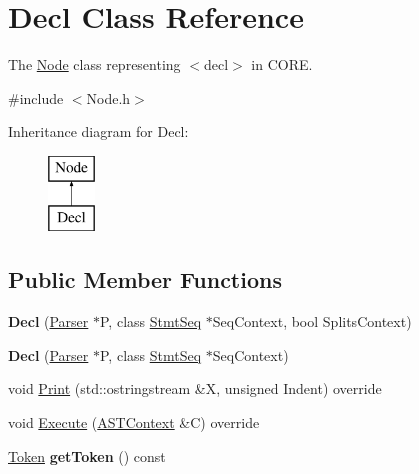\hypertarget{class_decl}{}\section{Decl Class Reference}
\label{class_decl}


The \mbox{\hyperlink{class_node}{Node}} class representing {\ttfamily $<$decl$>$} in C\+O\+RE.  




{\ttfamily \#include $<$Node.\+h$>$}

Inheritance diagram for Decl\+:\begin{figure}[H]
\begin{center}
\leavevmode
\includegraphics[height=2.000000cm]{class_decl}
\end{center}
\end{figure}
\subsection*{Public Member Functions}
\begin{DoxyCompactItemize}
\item 
\mbox{\label{class_decl_a4635985e7c8ccc1300980ff08e0c6b7a}} 
{\bfseries Decl} (\mbox{\hyperlink{class_parser}{Parser}} $\ast$P, class \mbox{\hyperlink{class_stmt_seq}{Stmt\+Seq}} $\ast$Seq\+Context, bool Splits\+Context)
\item 
\mbox{\label{class_decl_a163142f1e716666933ca511ccfdadb73}} 
{\bfseries Decl} (\mbox{\hyperlink{class_parser}{Parser}} $\ast$P, class \mbox{\hyperlink{class_stmt_seq}{Stmt\+Seq}} $\ast$Seq\+Context)
\item 
void \mbox{\hyperlink{class_decl_a2cd337f551b0a66d6787816c0a4a907a}{Print}} (std\+::ostringstream \&X, unsigned Indent) override
\item 
void \mbox{\hyperlink{class_decl_a6ac3129b12248807b15edc3377cb448f}{Execute}} (\mbox{\hyperlink{class_a_s_t_context}{A\+S\+T\+Context}} \&C) override
\item 
\mbox{\label{class_decl_aacac0556aea3276267178d35e3236abc}} 
\mbox{\hyperlink{class_token}{Token}} {\bfseries get\+Token} () const
\end{DoxyCompactItemize}
